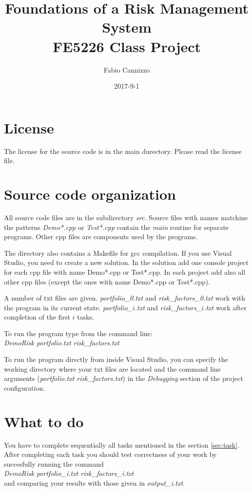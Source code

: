 \documentclass[10pt]{article}
\title{Foundations of a Risk Management System \\
\large FE5226 Class Project
}
\author{Fabio Cannizzo}
\date{2017-9-1}
\begin{document}
\maketitle


\section{License}
The license for the source code is in the main durectory. Please read the license file.
\section{Source code organization}
All source code files are in the subdirectory \textit{src}. Source files with names matchine the patterns \textit{Demo*.cpp} or \textit{Test*.cpp} contain the \textit{main} routine for separate programs. Other cpp files are components used by the programs.

The directory also contains a Makefile for gcc compilation. If you use Visual Studio, you need to create a new solution. In the solution add one console project for each cpp file with name Demo*.cpp or Test*.cpp. In each project add also all other cpp files (except the ones with name Demo*.cpp or Test*.cpp).

A number of txt files are given. \textit{portfolio\_0.txt} and \textit{risk\_factors\_0.txt} work with the program in its current state. \textit{portfolio\_$i$.txt} and \textit{risk\_factors\_$i$.txt} work after completion of the first $i$ tasks.

To run the program type from the command line:\\
\textit{DemoRisk portfolio.txt risk\_factors.txt}

To run the program directly from inside Visual Studio, you can specify the working directory where your txt files are located and the command line arguments (\textit{portfolio.txt risk\_factors.txt}) in the \textit{Debugging} section of the project configuration.

\section{What to do}
You have to complete sequentially all tasks mentioned in the section \ref{sec:task}. After completing each task you should test correctness of your work by succesfully running the command \\
\textit{DemoRisk portfolio\_i.txt risk\_factors\_i.txt}\\
and comparing your results with those given in \textit{output\_i.txt}.
\end{document}
